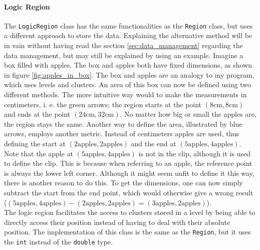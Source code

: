 \documentclass[10pt,a4paper,titlepage]{article}
\begin{document}
	\paragraph{Logic Region}
	The \verb|LogicRegion| class has the same functionalities as the \verb|Region| class, but uses a different approach to store the data. Explaining the alternative method will be in vain without having read the section \ref{sec:data_management} regarding the data management, but may still be explained by using an example.
	Imagine a box filled with apples. The box and apples both have fixed dimensions, as shown in figure \ref{fig:apples_in_box}. The box and apples are an analogy to my program, which uses levels and clusters. An area of this box can now be defined using two different methods. The more intuitive way would to make the measurements in centimeters, i. e. the green arrows; the region starts at the point \((8\text{cm},8\text{cm})\) and ends at the point \((24\text{cm}, 32\text{cm})\). No matter how big or small the apples are, the region stays the same. Another way to define the area, illustrated by blue arrows, employs another metric. Instead of centimeters apples are used, thus defining the start at \((2\text{apples},2\text{apples})\) and the end at \((5\text{apples},4\text{apples})\). Note that the apple at \((5\text{apples},4\text{apples})\) is not in the clip, although it is used to define the clip. This is because when referring to an apple, the reference point is always the lower left corner. Although it might seem unfit to define it this way, there is another reason to do this. To get the dimensions, one can now simply subtract the start from the end point, which would otherwise give a wrong result (\((5\text{apples},4\text{apples}) - (2\text{apples},2\text{apples}) = (3\text{apples},2\text{apples})\)).\\
	The logic region facilitates the access to clusters stored in a level by being able to directly access their position instead of having to deal with their absolute position. The implementation of this class is the same as the \verb|Region|, but it uses the \verb|int| instead of the \verb|double| type.
\end{document}
